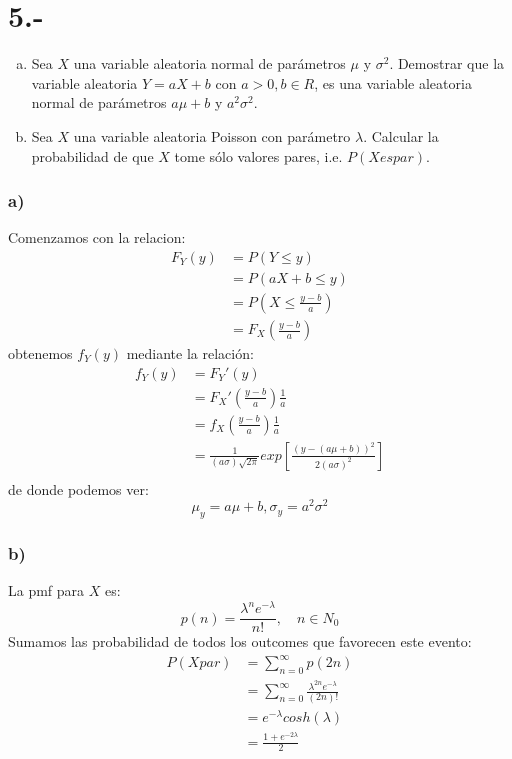 \documentclass{article}
\begin{document}
\section*{5.-}
\begin{enumerate}[a)]    
    \item Sea $X$ una variable aleatoria normal de parámetros $\mu$ y $\sigma^2$. Demostrar que la variable aleatoria $Y = aX+b$ con $a>0,b\in R$, 
    es una variable aleatoria normal de parámetros $a\mu +b$ y $a^2\sigma^2$.
    \item Sea $X$ una variable aleatoria Poisson con parámetro $\lambda$. Calcular la probabilidad de que $X$ tome sólo valores pares, i.e. $P(X es par)$.
\end{enumerate}
\begin{tcolorbox}[breakable]
    \subsubsection*{a)}
    Comenzamos con la relacion:
    \begin{align*}
        F_Y(y) 
        &= P(Y \leq y) \\
        &= P(aX+b \leq y) \\
        &= P(X \leq \tfrac{y-b}{a}) \\
        &= F_X(\tfrac{y-b}{a})
    \end{align*}
    obtenemos $f_Y(y)$ mediante la relación:
    \begin{align*}
        f_Y(y) 
        &= F_Y'(y) \\
        &= F_X'(\tfrac{y-b}{a})\tfrac{1}{a} \\
        &= f_X(\tfrac{y-b}{a})\tfrac{1}{a} \\
        &= \tfrac{1}{(a\sigma) \sqrt{2 \pi}}exp\left[{\tfrac{(y-(a\mu+b))^2}{2(a\sigma)^2}}\right] \\
    \end{align*}
    de donde podemos ver:
    \[ \mu_y = a\mu+b, \sigma_y = a^2\sigma^2 \]
    
    \subsubsection*{b)}
    La pmf para $X$ es:
    \[ p(n) = \frac{\lambda^ne^{-\lambda}}{n!}, \quad n \in N_0 \]
    Sumamos las probabilidad de todos los outcomes que favorecen este evento:
    \begin{align*}
        P(X par) 
        &= \sum_{n=0}^\infty p(2n) \\
        &= \sum_{n=0}^\infty \frac{\lambda^{2n}e^{-\lambda}}{(2n)!} \\
        &= e^{-\lambda}cosh(\lambda) \\
        &= \frac{1+e^{-2\lambda}}{2}
    \end{align*}
\end{tcolorbox}
\end{document}

